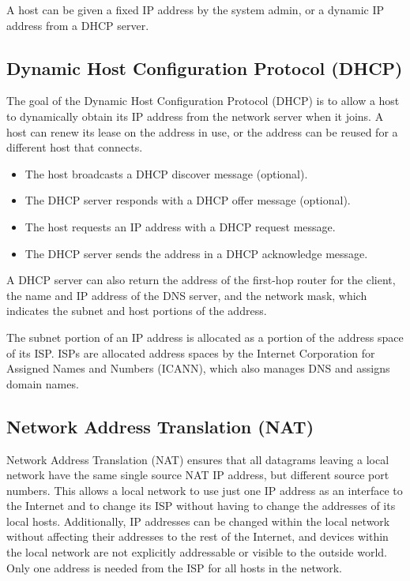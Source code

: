 A host can be given a fixed IP address by the system admin, or a dynamic IP address from a DHCP server.

\subsection{Dynamic Host Configuration Protocol (DHCP)}

The goal of the Dynamic Host Configuration Protocol (DHCP) is to allow a host to dynamically obtain its IP address from the network server when it joins.
A host can renew its lease on the address in use, or the address can be reused for a different host that connects.

\begin{itemize}
  \item The host broadcasts a DHCP discover message (optional).
  \item The DHCP server responds with a DHCP offer message (optional).
  \item The host requests an IP address with a DHCP request message.
  \item The DHCP server sends the address in a DHCP acknowledge message.
\end{itemize}

A DHCP server can also return the address of the first-hop router for the client, the name and IP address of the DNS server, and the network mask, which indicates the subnet and host portions of the address.

The subnet portion of an IP address is allocated as a portion of the address space of its ISP\@.
ISPs are allocated address spaces by the Internet Corporation for Assigned Names and Numbers (ICANN), which also manages DNS and assigns domain names.

\subsection{Network Address Translation (NAT)}

Network Address Translation (NAT) ensures that all datagrams leaving a local network have the same single source NAT IP address, but different source port numbers.
This allows a local network to use just one IP address as an interface to the Internet and to change its ISP without having to change the addresses of its local hosts.
Additionally, IP addresses can be changed within the local network without affecting their addresses to the rest of the Internet, and devices within the local network are not explicitly addressable or visible to the outside world.
Only one address is needed from the ISP for all hosts in the network.

